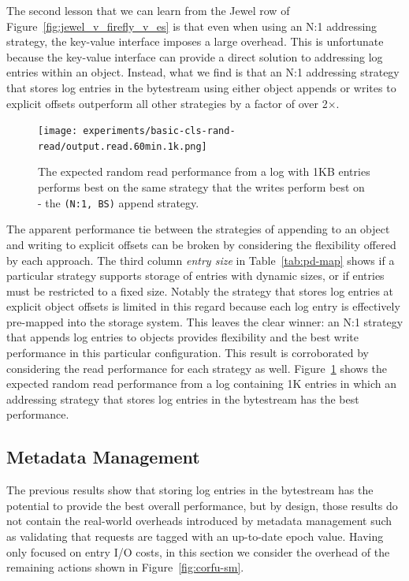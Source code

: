 \documentclass[10pt,twocolumn]{article}
\begin{document}
The second lesson that we can learn from the Jewel row of
Figure~\ref{fig:jewel_v_firefly_v_es} is that even when using an N:1 addressing
strategy, the key-value interface imposes a large overhead. This is unfortunate
because the key-value interface can provide a direct solution to addressing log
entries within an object.  Instead, what we find is that an N:1 addressing
strategy that stores log entries in the bytestream using either object appends
or writes to explicit offsets outperform all other strategies by a factor of
over 2\(\times\).

\begin{figure}[t]
      \centering
      \texttt{[image: experiments/basic-cls-rand-read/output.read.60min.1k.png]}
      \caption{The expected random read performance from a log with 1KB entries
      performs best on the same strategy that the writes perform
      best on - the \texttt{(N:1, BS)} append strategy.}
      \label{fig:vanilla_rd_jewel}
\end{figure}

The apparent performance tie between the strategies of appending to an object
and writing to explicit offsets can be broken by considering the flexibility
offered by each approach. The third column \emph{entry size} in
Table~\ref{tab:pd-map} shows if a particular strategy supports storage of
entries with dynamic sizes, or if entries must be restricted to a fixed size.
Notably the strategy that stores log entries at explicit object offsets is
limited in this regard because each log entry is effectively pre-mapped into
the storage system. This leaves the clear winner: an N:1 strategy that appends
log entries to objects provides flexibility and the best write performance in
this particular configuration.  This result is corroborated by considering the
read performance for each strategy as well. Figure~\ref{fig:vanilla_rd_jewel}
shows the expected random read performance from a log containing 1K entries in
which an addressing strategy that stores log entries in the bytestream has the
best performance.

\subsection{Metadata Management}

The previous results show that storing log entries in the bytestream has the
potential to provide the best overall performance, but by design, those
results do not contain the real-world overheads introduced by metadata
management such as validating that requests are tagged with an up-to-date
epoch value. Having only focused on entry I/O costs, in this section we
consider the overhead of the remaining actions shown in
Figure~\ref{fig:corfu-sm}.
\end{document}
